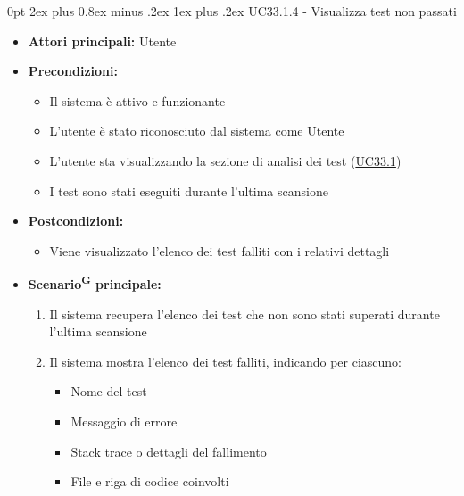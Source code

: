 \documentclass[a4paper, 11pt]{article}
\makeatletter
\renewcommand\subparagraph{\@startsection{subparagraph}{5}
  {0pt}
  {2ex plus 0.8ex minus .2ex}
  {1ex plus .2ex}
  {\normalfont\normalsize\bfseries\color{AccentColor}}}
\makeatother
\begin{document}
\subparagraph{UC33.1.4 - Visualizza test non passati}\label{UC33.1.4}
\begin{itemize}
    \item \textbf{Attori principali:} Utente
    \item \textbf{Precondizioni:}
    \begin{itemize}
        \item Il sistema è attivo e funzionante
        \item L'utente è stato riconosciuto dal sistema come Utente
        \item L'utente sta visualizzando la sezione di analisi dei test (\hyperref[UC33.1]{UC33.1})
        \item I test sono stati eseguiti durante l'ultima scansione
    \end{itemize}
    \item \textbf{Postcondizioni:}
    \begin{itemize}
        \item Viene visualizzato l'elenco dei test falliti con i relativi dettagli
    \end{itemize}
    \item \textbf{Scenario\textsuperscript{G} principale:}
    \begin{enumerate}
        \item Il sistema recupera l'elenco dei test che non sono stati superati durante l'ultima scansione
        \item Il sistema mostra l'elenco dei test falliti, indicando per ciascuno:
        \begin{itemize}
            \item Nome del test
            \item Messaggio di errore
            \item Stack trace o dettagli del fallimento
            \item File e riga di codice coinvolti
        \end{itemize}
    \end{enumerate}
    
\end{itemize}
\end{document}
